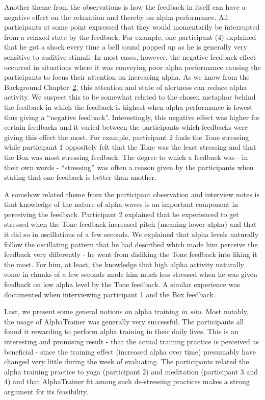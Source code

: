 \documentclass[a4paper,10pt,english,lof,lot,twoside]{puthesis}
\begin{document}
Another theme from the observations is how the feedback in itself can have a negative effect on the relaxation and thereby on alpha performance. All participants at some point expressed that they would momentarily be interrupted from a relaxed state by the feedback. For example, one participant (4) explained that he got a shock every time a bell sound popped up as he is generally very sensitive to auditive stimuli. In most cases, however, the negative feedback effect occurred in situations where it was conveying poor alpha performance causing the participants to focus their attention on increasing alpha. As we know from the Background Chapter {\hyperref[ch-background/index:ch-background]{2}}, this attention and state of alertness can reduce alpha activity. We suspect this to be somewhat related to the chosen metaphor behind the feedback in which the feedback is highest when alpha performance is lowest thus giving a ``negative feedback''. Interestingly, this negative effect was higher for certain feedbacks and it varied between the participants which feedbacks were giving this effect the most. For example, participant 2 finds the Tone stressing while participant 1 oppositely felt that the Tone was the least stressing and that the Box was most stressing feedback. The degree to which a feedback was - in their own words - ``stressing'' was often a reason given by the participants when stating that one feedback is better than another.

A somehow related theme from the participant observation and interview notes is that knowledge of the nature of alpha waves is an important component in perceiving the feedback. Participant 2 explained that he experienced to get stressed when the Tone feedback increased pitch (meaning lower alpha) and that it did so in oscillations of a few seconds. We explained that alpha levels naturally follow the oscillating pattern that he had described which made him perceive the feedback very differently - he went from disliking the Tone feedback into liking it the most. For him, at least, the knowledge that high alpha activity naturally come in chunks of a few seconds made him much less stressed when he was given feedback on low alpha level by the Tone feedback. A similar experience was documented when interviewing participant 1 and the Box feedback.

Last, we present some general notions on alpha training \emph{in situ}. Most notably, the usage of AlphaTrainer was generally very successful. The participants all found it rewarding to perform alpha training in their daily lives. This is an interesting and promising result - that the actual training practice is perceived as beneficial - since the training effect (increased alpha over time) presumably have changed very little during the week of evaluating. The participants related the alpha training practice to yoga (participant 2) and meditation (participant 3 and 4) and that AlphaTrainer fit among such de-stressing practices makes a strong argument for its feasibility.
\end{document}

